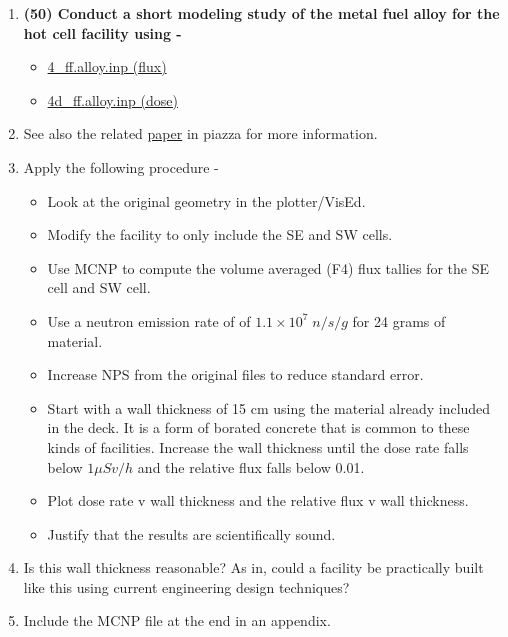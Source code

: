 \documentclass[11pt,a4paper]{article}
\begin{document}
\begin{enumerate}[leftmargin=*,topsep=0pt,font=\bfseries]
        \newpage 
    \item\textbf{(50) Conduct a short modeling study of the metal fuel alloy for the hot cell facility using - }
        \begin{itemize}[leftmargin=*,topsep=0pt]
            \item\href{https://github.com/TheDoctorRAB/mcnpx.decks/blob/master/neutron.flux/input/4_ff.alloy.inp}{4\_ff.alloy.inp (flux)}
            \item\href{https://github.com/TheDoctorRAB/mcnpx.decks/blob/master/neutron.flux/input/4d_ff.alloy.inp}{4d\_ff.alloy.inp (dose)}
        \end{itemize}
    \item[]See also the related \href{https://piazza.com/class_profile/get_resource/kbjsrzm65to4ul/kbjss2sfmbe4wu}{paper} in piazza for more information.
    \item[]Apply the following procedure - 
        \begin{itemize}
            \item Look at the original geometry in the plotter/VisEd.
            \item Modify the facility to only include the SE and SW cells.
            \item Use MCNP to compute the volume averaged (F4) flux tallies for the SE cell and SW cell.
            \item Use a neutron emission rate of of $1.1 \times 10^7 \; n/s/g$ for 24 grams of material. 
            \item Increase NPS from the original files to reduce standard error.
            \item Start with a wall thickness of 15 cm using the material already included in the deck. It is a form of borated concrete that is common to these kinds of facilities. Increase the wall thickness until the dose rate falls below $1 \mu Sv/h$ and the relative flux falls below 0.01.
            \item Plot dose rate v wall thickness and the relative flux v wall thickness.
            \item Justify that the results are scientifically sound.
        \end{itemize}
    \item[]Is this wall thickness reasonable? As in, could a facility be practically built like this using current engineering design techniques?
    \item[]Include the MCNP file at the end in an appendix.
        \vspace{0.25in}\\























\end{enumerate}
\end{document}

